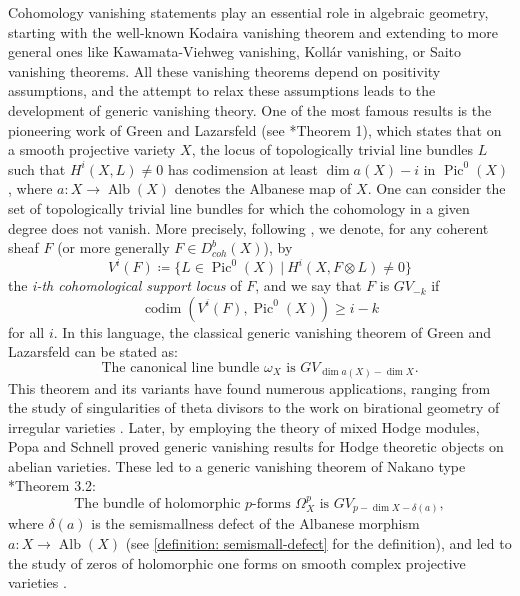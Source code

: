 \documentclass[11pt]{amsart}
\theoremstyle{definition}
\theoremstyle{plain}
\DeclareMathOperator{\Pic}{Pic}
\DeclareMathOperator{\codim}{codim}
\DeclareMathOperator{\Alb}{Alb}
\newcommand{\Kollar}{Koll\'ar}
\begin{document}
Cohomology vanishing statements play an essential role in algebraic geometry, starting with the well-known Kodaira vanishing theorem and extending to more general ones like Kawamata-Viehweg vanishing, \Kollar{} vanishing, or Saito vanishing theorems. All these vanishing theorems depend on positivity assumptions, and the attempt to relax these assumptions leads to the development of generic vanishing theory. One of the most famous results is the pioneering work of Green and Lazarsfeld (see \cite{GL87}*{Theorem 1}), which states that on a smooth projective variety $X$, the locus of topologically trivial line bundles $L$ such that $H^i(X,L) \neq 0$ has codimension at least $\dim a(X)-i$ in $\Pic^0(X)$, where $a:X \to \Alb(X)$ denotes the Albanese map of $X$. One can consider the set of topologically trivial line bundles for which the cohomology in a given degree does not vanish. More precisely, following \cite{PP_Generic_Vanishing}, we denote, for any coherent sheaf $F$ (or more generally $F\in D_{coh}^b(X)$), by 
\[V^i(F)\coloneqq \{L \in \Pic^0(X)\ |\  H^i(X, F\otimes L)\neq 0\}\]
the \textit{i-th cohomological support locus} of $F$, and we say that $F$ is $GV_{-k}$ if 
\[\codim(V^i(F), \Pic^0(X)) \ge i-k\]
for all $i$. In this language, the classical generic vanishing theorem of Green and Lazarsfeld can be stated as:
\begin{equation} \label{classical GV theorem}
    \text{The canonical line bundle } \omega_X \text{ is } GV_{\dim a(X)- \dim X}.
\end{equation} 
This theorem and its variants have found numerous applications, ranging from the study of singularities of theta divisors \cite{EL-sing_of_theta} to the work on birational geometry of irregular varieties \cite{Hacon-Ueno_conj}. Later, by employing the theory of mixed Hodge modules, Popa and Schnell proved generic vanishing results for Hodge theoretic objects on abelian varieties. These led to a generic vanishing theorem of Nakano type \cite{PS_generic_vanishing}*{Theorem 3.2}:
\begin{equation} \label{PS generic Nakano vanishing}
    \text{The bundle of holomorphic $p$-forms } \Omega^p_X \text{ is } GV_{p-\dim X-\delta(a)},
\end{equation}
where $\delta(a)$ is the semismallness defect of the Albanese morphism $a:X\to \Alb(X)$ (see \ref{definition: semismall-defect} for the definition), and led to the study of zeros of holomorphic one forms on smooth complex projective varieties \cite{zeros_of_holo_forms}. 
    
\end{document}
